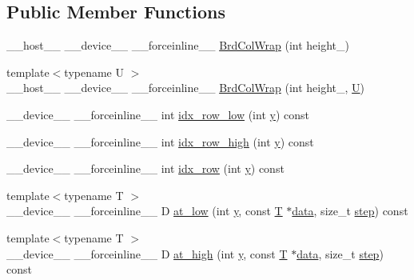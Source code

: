 \subsection*{Public Member Functions}
\begin{DoxyCompactItemize}
\item 
\-\_\-\-\_\-host\-\_\-\-\_\- \-\_\-\-\_\-device\-\_\-\-\_\- \-\_\-\-\_\-forceinline\-\_\-\-\_\- \hyperlink{structcv_1_1gpu_1_1device_1_1BrdColWrap_a686a5e0721d1b442f6ea558f730ec68a}{Brd\-Col\-Wrap} (int height\-\_\-)
\item 
{\footnotesize template$<$typename U $>$ }\\\-\_\-\-\_\-host\-\_\-\-\_\- \-\_\-\-\_\-device\-\_\-\-\_\- \-\_\-\-\_\-forceinline\-\_\-\-\_\- \hyperlink{structcv_1_1gpu_1_1device_1_1BrdColWrap_a9cc825ec2725a8d3df9575ced40a947d}{Brd\-Col\-Wrap} (int height\-\_\-, \hyperlink{core__c_8h_aa9c521f41af9a5191e5e4b6ffbae211a}{U})
\item 
\-\_\-\-\_\-device\-\_\-\-\_\- \-\_\-\-\_\-forceinline\-\_\-\-\_\- int \hyperlink{structcv_1_1gpu_1_1device_1_1BrdColWrap_a374fe2c1f6b57730122af6927523b59e}{idx\-\_\-row\-\_\-low} (int \hyperlink{highgui__c_8h_af1202c02b14870c18fb3a1da73e9e7c7}{y}) const 
\item 
\-\_\-\-\_\-device\-\_\-\-\_\- \-\_\-\-\_\-forceinline\-\_\-\-\_\- int \hyperlink{structcv_1_1gpu_1_1device_1_1BrdColWrap_a6ed926db0e3feab3298b5d1781dbe0d7}{idx\-\_\-row\-\_\-high} (int \hyperlink{highgui__c_8h_af1202c02b14870c18fb3a1da73e9e7c7}{y}) const 
\item 
\-\_\-\-\_\-device\-\_\-\-\_\- \-\_\-\-\_\-forceinline\-\_\-\-\_\- int \hyperlink{structcv_1_1gpu_1_1device_1_1BrdColWrap_afd8f87eb7d6731e95366709bb54621f9}{idx\-\_\-row} (int \hyperlink{highgui__c_8h_af1202c02b14870c18fb3a1da73e9e7c7}{y}) const 
\item 
{\footnotesize template$<$typename T $>$ }\\\-\_\-\-\_\-device\-\_\-\-\_\- \-\_\-\-\_\-forceinline\-\_\-\-\_\- D \hyperlink{structcv_1_1gpu_1_1device_1_1BrdColWrap_ac47c2d81db14847fc6cfd9568cdbbfaf}{at\-\_\-low} (int \hyperlink{highgui__c_8h_af1202c02b14870c18fb3a1da73e9e7c7}{y}, const \hyperlink{calib3d_8hpp_a3efb9551a871ddd0463079a808916717}{T} $\ast$\hyperlink{legacy_8hpp_ab9fe6c09e6d02865a953fffc12fe6ca0}{data}, size\-\_\-t \hyperlink{legacy_8hpp_abc16e65f240ed0c8f3e876e8732c0a33}{step}) const 
\item 
{\footnotesize template$<$typename T $>$ }\\\-\_\-\-\_\-device\-\_\-\-\_\- \-\_\-\-\_\-forceinline\-\_\-\-\_\- D \hyperlink{structcv_1_1gpu_1_1device_1_1BrdColWrap_a0cdce2fb7abe76303b32291e36f6878b}{at\-\_\-high} (int \hyperlink{highgui__c_8h_af1202c02b14870c18fb3a1da73e9e7c7}{y}, const \hyperlink{calib3d_8hpp_a3efb9551a871ddd0463079a808916717}{T} $\ast$\hyperlink{legacy_8hpp_ab9fe6c09e6d02865a953fffc12fe6ca0}{data}, size\-\_\-t \hyperlink{legacy_8hpp_abc16e65f240ed0c8f3e876e8732c0a33}{step}) const 

\end{DoxyCompactItemize}
